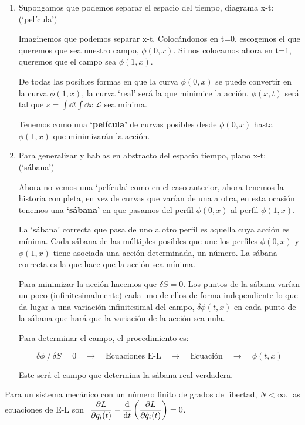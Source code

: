\begin{enumerate}[$\triangleright\ \ $ a) ]
\item Supongamos que podemos separar el espacio del tiempo, diagrama x-t: (`película')

Imaginemos que podemos separar x-t. Colocándonos en t=0, escogemos el que queremos que sea nuestro campo, $\phi(0,x)$. Si nos colocamos ahora en t=1, queremos que el campo sea $\phi(1,x)$. 

De todas las posibles formas en que la curva  $\phi(0,x)$ se puede convertir en la curva  $\phi(1,x)$, la curva `real' será la que minimice la acción. $\phi(x,t)$ será tal que $s=\displaystyle \int \dd t \int \dd x \ \mathcal L$ sea mínima.

Tenemos como una \textbf{`película'} de curvas posibles desde  $\phi(0,x)$ hasta  $\phi(1,x)$ que minimizarán la acción. 



\item Para generalizar y hablas en abstracto del espacio tiempo, plano x-t: (`sábana')

Ahora no vemos una `película' como en el caso anterior, ahora tenemos la historia completa, en vez de curvas que varían de una a otra, en esta ocasión tenemos una \textbf{`sábana'} en que pasamos del perfil $\phi(0,x)$ al perfil $\phi(1,x)$.


La `sábana' correcta que pasa de uno a otro perfil es aquella cuya acción es mínima. Cada sábana de las múltiples posibles que une los perfiles $\phi(0,x)$ y  $\phi(1,x)$  tiene asociada una acción determinada, un número. La sábana correcta es la que hace que la acción sea mínima.

Para minimizar la acción hacemos que $\delta S=0$. Los puntos de la sábana varían un poco (infinitesimalmente) cada uno de ellos de forma independiente lo que da lugar a una variación infinitesimal del campo, $\delta \phi(t,x)$ en cada punto de la sábana que hará que la variación de la acción sea nula.

Para determinar el campo, el procedimiento es:

$$\delta \phi \ / \ \delta S=0 \quad \to \quad \text{Ecuaciones E-L} \quad \to \quad \text{Ecuación} \quad \to \quad \phi(t,x)$$

Este será el campo que determina la sábana real-verdadera.

\end{enumerate}

Para un sistema mecánico con un número finito de grados de libertad, $N< \infty$, las ecuaciones de E-L son $\ \displaystyle \pdv{L}{q_i(t)}-\dv{t}  \left( \pdv{L}{\dot q_i(t)} \right) = 0$. 

